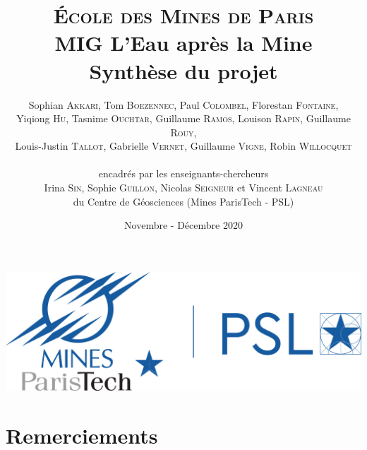 \documentclass{article}
\title{ \textbf{ {\color{couleurmines}
\Huge{\textsc{École des Mines de Paris}}\\
\vspace{1.5 cm}
MIG L'Eau après la Mine\\\vspace{1 cm}Synthèse du projet}}
\vspace{1 cm}
}
\author{%
Sophian \textsc{Akkari},
Tom \textsc{Boezennec}, 
Paul \textsc{Colombel}, 
Florestan \textsc{Fontaine},\\
Yiqiong \textsc{Hu}, 
Tasnime \textsc{Ouchtar}, 
Guillaume \textsc{Ramos}, 
Louison \textsc{Rapin}, 
Guillaume \textsc{Rouy},\\ 
Louis-Justin \textsc{Tallot}, 
Gabrielle \textsc{Vernet}, 
Guillaume \textsc{Vigne}, 
Robin \textsc{Willocquet}\\
\\
encadrés par les enseignants-chercheurs \\
Irina \textsc{Sin}, 
Sophie \textsc{Guillon}, 
Nicolas \textsc{Seigneur}
et Vincent \textsc{Lagneau} \\
du Centre de Géosciences (Mines ParisTech - PSL)}
\date{Novembre - Décembre 2020}
\begin{document}

\maketitle
\thispagestyle{empty}
\vspace{1 cm}
\begin{center}
    \includegraphics[width = 0.4\linewidth]{logoMPT.png}
\end{center}
\newpage
{}

\section*{Remerciements}
\end{document}

